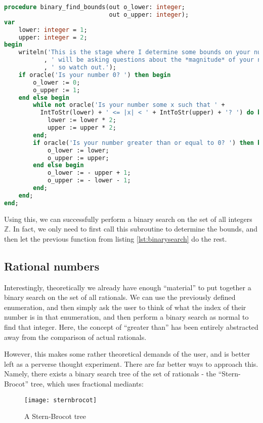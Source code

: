 \documentclass[fleqn,a4paper,11pt]{article}
\begin{document}
\begin{lstlisting}[language=Pascal, caption=Bound-finding subroutine in Pascal]
procedure binary_find_bounds(out o_lower: integer;
                             out o_upper: integer);
var
    lower: integer = 1;
    upper: integer = 2;
begin
    writeln('This is the stage where I determine some bounds on your number. I'
           , ' will be asking questions about the *magnitude* of your number,'
           , ' so watch out.');
    if oracle('Is your number 0? ') then begin
        o_lower := 0;
        o_upper := 1;
    end else begin
        while not oracle('Is your number some x such that ' +
          IntToStr(lower) + ' <= |x| < ' + IntToStr(upper) + '? ') do begin
            lower := lower * 2;
            upper := upper * 2;
        end;
        if oracle('Is your number greater than or equal to 0? ') then begin
            o_lower := lower;
            o_upper := upper;
        end else begin
            o_lower := - upper + 1;
            o_upper := - lower - 1;
        end;
    end;
end;
\end{lstlisting}

    Using this, we can successfully perform a binary search on the set of all
    integers $\mathbb{Z}$. In fact, we only need to first call this subroutine
    to determine the bounds, and then let the previous function from listing
    \ref{lst:binarysearch} do the rest.

    \subsection{Rational numbers}

    Interestingly, theoretically we already have enough ``material'' to put
    together a binary search on the set of all rationals. We can use the
    previously defined enumeration, and then simply ask the user to think of
    what the index of their number is in that enumeration, and then perform a
    binary search as normal to find that integer. Here, the concept of ``greater
    than'' has been entirely abstracted away from the comparison of actual
    rationals.

    However, this makes some rather theoretical demands of the user, and is
    better left as a perverse thought experiment. There are far better ways to
    approach this. Namely, there exists a binary search tree of the set of
    rationals - the ``Stern-Brocot'' tree, which uses fractional mediants:

    \begin{figure}[h]
        \texttt{[image: sternbrocot]}
        \centering
        \caption{A Stern-Brocot tree}
    \end{figure}
\end{document}
